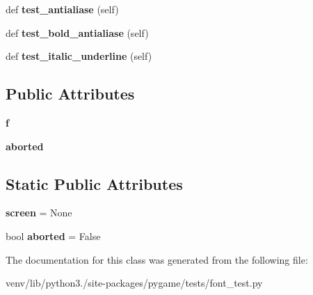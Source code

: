 \begin{DoxyCompactItemize}
\mbox{\label{classpygame_1_1tests_1_1font__test_1_1_visual_tests_ae3c5b56346cd6f4d50d906c0f18b35e9}} 
def {\bfseries test\+\_\+antialiase} (self)
\item 
\mbox{\label{classpygame_1_1tests_1_1font__test_1_1_visual_tests_a4cc49d7b105f4ac64b5b9500bddb1b54}} 
def {\bfseries test\+\_\+bold\+\_\+antialiase} (self)
\item 
\mbox{\label{classpygame_1_1tests_1_1font__test_1_1_visual_tests_a5f4cc6c922719a9db299df0e73024537}} 
def {\bfseries test\+\_\+italic\+\_\+underline} (self)
\end{DoxyCompactItemize}
\subsection*{Public Attributes}
\begin{DoxyCompactItemize}
\item 
\mbox{\label{classpygame_1_1tests_1_1font__test_1_1_visual_tests_aaed02201969e197b373cf6ee83fad36e}} 
{\bfseries f}
\item 
\mbox{\label{classpygame_1_1tests_1_1font__test_1_1_visual_tests_ab84d7df3937dc794cb587d177bb06ab8}} 
{\bfseries aborted}
\end{DoxyCompactItemize}
\subsection*{Static Public Attributes}
\begin{DoxyCompactItemize}
\item 
\mbox{\label{classpygame_1_1tests_1_1font__test_1_1_visual_tests_a6c2477fb69bed489700e0be7652709ac}} 
{\bfseries screen} = None
\item 
\mbox{\label{classpygame_1_1tests_1_1font__test_1_1_visual_tests_a2c7d3e75f79e77e12f493a5d8c779044}} 
bool {\bfseries aborted} = False
\end{DoxyCompactItemize}


The documentation for this class was generated from the following file\+:\begin{DoxyCompactItemize}
\item 
venv/lib/python3./site-\/packages/pygame/tests/font\+\_\+test.\+py\end{DoxyCompactItemize}
